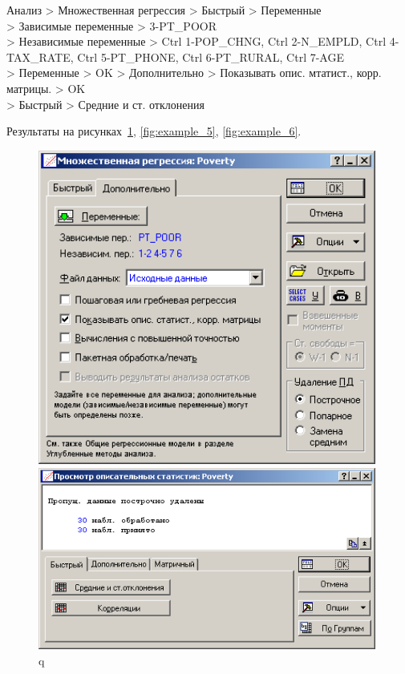 Анализ > Множественная регрессия > Быстрый > Переменные\\
> Зависимые переменные > 3-PT\_POOR\\
> Независимые переменные > Ctrl 1-POP\_CHNG, Ctrl 2-N\_EMPLD,
Ctrl 4-TAX\_RATE, Ctrl 5-PT\_PHONE, Ctrl 6-PT\_RURAL, Ctrl 7-AGE\\
> Переменные > OK > Дополнительно > Показывать опис. мтатист., корр. матрицы. > OK\\
> Быстрый > Средние и ст. отклонения

Результаты на рисунках~\ref{fig:example_4}, \ref{fig:example_5}, \ref{fig:example_6}.

\begin{figure}[!h]
  \centering
  \begin{minipage}{0.36\textwidth}
    \centering

    \includegraphics[width=0.99\textwidth]
    {inc/example_4.PNG}

    \caption{q}
    \label{fig:example_4}
  \end{minipage}
  \begin{minipage}{0.36\textwidth}
    \centering

    \includegraphics[width=0.99\textwidth]
    {inc/example_5.PNG}


\end{minipage}
\end{figure}
